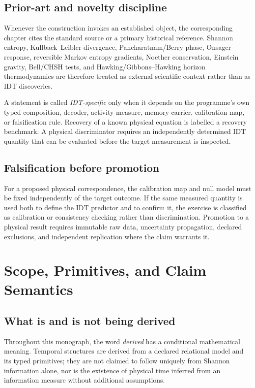 \documentclass[11pt]{book}
\begin{document}
\section*{Prior-art and novelty discipline}

Whenever the construction invokes an established object, the corresponding chapter cites the standard source or a primary historical reference. Shannon entropy, Kullback--Leibler divergence, Pancharatnam/Berry phase, Onsager response, reversible Markov entropy gradients, Noether conservation, Einstein gravity, Bell/CHSH tests, and Hawking/Gibbons--Hawking horizon thermodynamics are therefore treated as external scientific context rather than as IDT discoveries.

A statement is called \emph{IDT-specific} only when it depends on the programme's own typed composition, decoder, activity measure, memory carrier, calibration map, or falsification rule. Recovery of a known physical equation is labelled a recovery benchmark. A physical discriminator requires an independently determined IDT quantity that can be evaluated before the target measurement is inspected.

\section*{Falsification before promotion}

For a proposed physical correspondence, the calibration map and null model must be fixed independently of the target outcome. If the same measured quantity is used both to define the IDT predictor and to confirm it, the exercise is classified as calibration or consistency checking rather than discrimination. Promotion to a physical result requires immutable raw data, uncertainty propagation, declared exclusions, and independent replication where the claim warrants it.

\chapter*{Scope, Primitives, and Claim Semantics}

\section*{What is and is not being derived}

Throughout this monograph, the word \emph{derived} has a conditional mathematical meaning. Temporal structures are derived from a declared relational model and its typed primitives; they are not claimed to follow uniquely from Shannon information alone, nor is the existence of physical time inferred from an information measure without additional assumptions.
\end{document}
